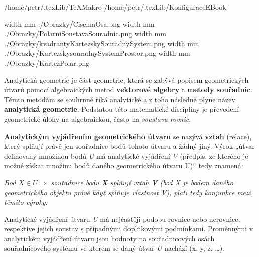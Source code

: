 
\def\addr{/home/petr/.texLib}

 \addr/TeXMakro
\setAddress{\addr}
 \addr/KonfiguraceEBook


\pdfximage width \the\SirkaOdstavce mm {./Obrazky/CiselnaOsa.png}
\pdfximage width \the\SirkaOdstavce mm {./Obrazky/PolarniSoustavaSouradnic.png}
\pdfximage width \the\SirkaOdstavce mm {./Obrazky/kvadrantyKartezskySouradnySystem.png}
\pdfximage width \the\SirkaOdstavce mm {./Obrazky/KartezskysouradnySystemProstor.png}
\pdfximage width \the\SirkaOdstavce mm {./Obrazky/KartezPolar.png}


\Obsah



Analytická geometrie je část geometrie, která se zabývá popisem geometrických útvarů pomocí algebraických metod {\bf vektorové algebry} a {\bf metody souřadnic}. Těmto metodám se souhrnně říká analytické a z toho následně plyne název {\bf analytická geometrie}. Podstatou této matematické disciplíny je převedení geometrické úlohy na algebraickou, často na {\it soustavu rovnic}.

{\bf Analytickým vyjádřením geometrického útvaru} se nazývá {\bf vztah} (relace), který splňují právě jen souřadnice bodů tohoto útvaru a žádný jiný. Výrok „útvar definovaný množinou bodů {\it U} má analytické vyjádření {\it V} (předpis, ze kterého je možné získat množinu bodů daného geometrického útvaru U)“ tedy znamená:

{\it Bod $X \in U \Rightarrow$ souřadnice bodu {\bf X} splňují vztah {\bf V} (bod X je bodem daného geometrického objektu právě když splňuje vlastnost V), platí tedy konjunkce mezi těmito výroky:}

\vskip 4mm


\vskip 4mm

Analytické vyjádření útvaru {\it U} má nejčastěji podobu rovnice nebo nerovnice, respektive jejich soustav s případnými doplňkovými podmínkami. Proměnnými v analytickém vyjádření útvaru jsou hodnoty na souřadnicových osách souřadnicového systému ve kterém se daný útvar {\it U} nachází (x, y, z, …).

